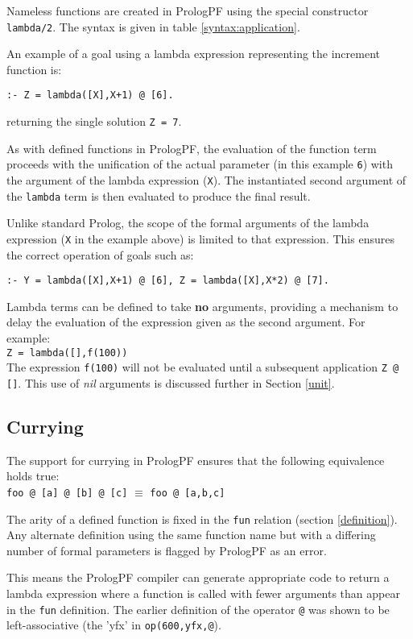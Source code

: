 Nameless functions are created in PrologPF using the special constructor
\texttt{lambda/2}.  The syntax is given in table \ref{syntax:application}.

An example of a goal using a lambda expression representing the increment
function is:

\texttt{:- Z = lambda([X],X+1) @ [6].}

returning the single solution \texttt{Z = 7}.

As with defined functions in PrologPF,
the evaluation of the function term proceeds
with the unification of the actual parameter (in this example
\texttt{6}) with the argument of the lambda expression (\texttt{X}).
The instantiated second argument of the \texttt{lambda} term is then evaluated
to produce the final result.

Unlike standard Prolog, the scope of the formal arguments of the lambda
expression (\texttt{X} in the example above) is limited to that expression.
This ensures the correct operation of goals such as:\\
\centerline{\texttt{:- Y = lambda([X],X+1) @ [6], Z = lambda([X],X*2) @ [7].}}

Lambda terms can be defined to take \textbf{no} arguments, providing a
mechanism to delay the evaluation of the expression given as the second
argument.  For example:\\
\texttt{Z = lambda([],f(100))}\\
The expression \texttt{f(100)} will not be evaluated until a subsequent application
\texttt{Z @ []}.  This use of \textit{nil} arguments is discussed further in
Section \ref{unit}.

\subsection{Currying}

The support for currying in PrologPF ensures that the following equivalence holds
true:\\
\texttt{foo @ [a] @ [b] @ [c]} $\equiv$ \texttt{foo @ [a,b,c]}

The arity of a defined function is fixed in the \texttt{fun} relation
(section \ref{definition}). Any alternate definition using the same function
name but with a differing number of formal parameters is flagged by PrologPF
as an error.

This means the PrologPF compiler can generate appropriate code to return a lambda
expression where a function is called with fewer arguments than appear in the
\texttt{fun} definition. The earlier definition of the operator \texttt{@} was shown to be
left-associative (the 'yfx' in \texttt{op(600,yfx,@}).


